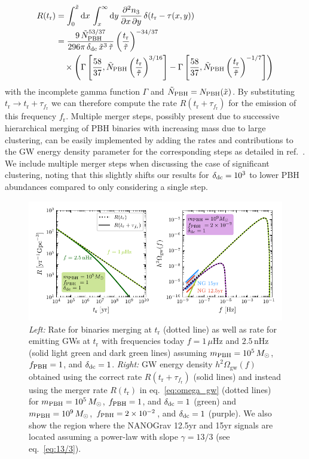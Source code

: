 \begin{align}
	R (t_\text{r}) &= \int_0^{\tilde{x}} \mathrm{d} x \, \int_x^\infty \mathrm{d} y \, \frac{\partial^2 n_3}{\partial x \, \partial y} \, \delta (t_\text{r} - \tau (x, y)) \nonumber \\
	&= \frac{9 \, \tilde{N}^{53/37}_{\mathrm{PBH}}}{296 \pi \, \delta_{\mathrm{dc}} \, \tilde{x}^3 \, \tilde{\tau}} \left( \frac{t_\text{r}}{\tilde{\tau}} \right)^{-34/37} \nonumber \\
	& \quad \times \left( \Gamma \left[ \frac{58}{37}, \tilde{N}_{\mathrm{PBH}} \left( \frac{t_\text{r}}{\tilde{\tau}} \right)^{3/16} \right] - \Gamma \left[ \frac{58}{37}, \tilde{N}_{\mathrm{PBH}} \left( \frac{t_\text{r}}{\tilde{\tau}} \right)^{-1/7} \right] \right)
\end{align}
with the incomplete gamma function $\Gamma$ and $\tilde{N}_{\mathrm{PBH}} = N_{\mathrm{PBH}} (\tilde{x})$. By substituting $t_\text{r} \rightarrow t_\text{r}+ \tau_{f_\text{r}}$ we can therefore compute the rate $R(t_\text{r} + \tau_{f_\text{r}})$ for the emission of this frequency $f_\text{r}$. Multiple merger steps, possibly present due to successive hierarchical merging of \ac{PBH} binaries with increasing mass due to large clustering, can be easily implemented by adding the rates and contributions to the \ac{GW} energy density parameter for the corresponding steps as detailed in ref.~\cite{Bringmann:2018mxj}. We include multiple merger steps when discussing the case of significant clustering, noting that this slightly shifts our results for $\delta_{\mathrm{dc}} = 10^3$ to lower \ac{PBH} abundances compared to only considering a single step.

\begin{figure}[t]
	\centering
	\includegraphics[width=\textwidth]{thesisplots/pbh/pbh_1.pdf}
	\caption{\textit{Left:} Rate for binaries merging at $t_\text{r}$ (dotted line) as well as rate for emitting \acp{GW} at $t_\text{r}$ with frequencies today $f = 1 \, \mu\mathrm{Hz}$ and $2.5 \, \mathrm{nHz}$ (solid light green and dark green lines) assuming $m_{\mathrm{PBH}} = 10^5 \, M_\odot$, $f_{\mathrm{PBH}} = 1$, and $\delta_{\mathrm{dc}} = 1$. \textit{Right:} \ac{GW} energy density $h^2\Omega_\text{gw}(f)$ obtained using the correct rate $R(t_\text{r} + \tau_{f_\text{r}})$ (solid lines) and instead using the merger rate $R(t_\text{r})$ in eq.~\eqref{eq:omega_gw} (dotted lines) for $m_{\mathrm{PBH}} = 10^5 \, M_\odot$, $f_{\mathrm{PBH}} = 1$, and $\delta_{\mathrm{dc}} = 1$ (green) and $m_{\mathrm{PBH}} = 10^9 \, M_\odot$, $f_{\mathrm{PBH}} = 2 \times 10^{-2}$, and $\delta_{\mathrm{dc}} = 1$ (purple). We also show the region where the \ac{NANOGrav} 12.5yr and 15yr signals are located assuming a power-law with slope $\gamma = 13/3$ (see eq.~\eqref{eq:13/3}).}
	\label{fig:rate_ogw}
\end{figure}


